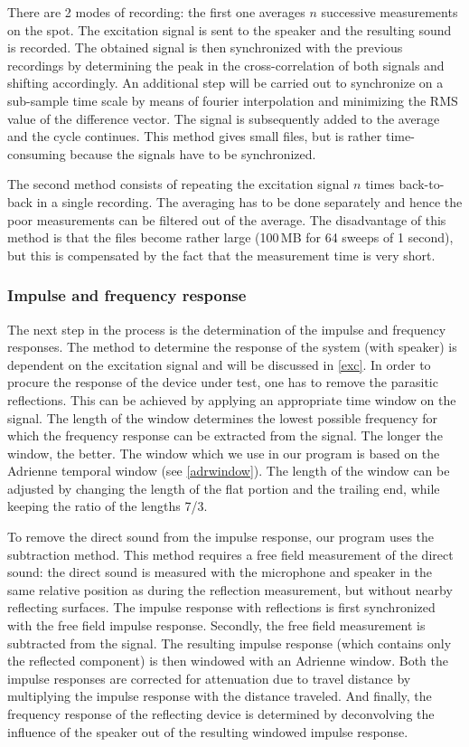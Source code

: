 There are 2 modes of recording: the first one averages $n$ successive measurements on the spot. The excitation signal is sent to the speaker and the resulting sound is recorded. The obtained signal is then synchronized with the previous recordings by determining the peak in the cross-correlation of both signals and shifting accordingly. An additional step will be carried out to synchronize on a sub-sample time scale by means of fourier interpolation and minimizing the RMS value of the difference vector. The signal is subsequently added to the average and the cycle continues. This method gives small files, but is rather time-consuming because the signals have to be synchronized.

The second method consists of repeating the excitation signal $n$ times back-to-back in a single recording. The averaging has to be done separately and hence the poor measurements can be filtered out of the average. The disadvantage of this method is that the files become rather large (100\,MB for 64 sweeps of 1 second), but this is compensated by the fact that the measurement time is very short.



\subsubsection*{Impulse and frequency response}
The next step in the process is the determination of the impulse and frequency responses. The method to determine the response of the system (with speaker) is dependent on the excitation signal and will be discussed in \ref{exc}. In order to procure the response of the device under test, one has to remove the parasitic reflections. This can be achieved by applying an appropriate time window on the signal. The length of the window determines the lowest possible frequency for which the frequency response can be extracted from the signal. The longer the window, the better. The window which we use in our program is based on the Adrienne temporal window (see \ref{adrwindow}). The length of the window can be adjusted by changing the length of the flat portion and the trailing end, while keeping the ratio of the lengths 7/3.

To remove the direct sound from the impulse response, our program uses the subtraction method. This method requires a free field measurement of the direct sound: the direct sound is measured with the microphone and speaker in the same relative position as during the reflection measurement, but without nearby reflecting surfaces. The impulse response with reflections is first synchronized with the free field impulse response. Secondly, the free field measurement is subtracted from the signal. The resulting impulse response (which contains only the reflected component) is then windowed with an Adrienne window. Both the impulse responses are corrected for attenuation due to travel distance by multiplying the impulse response with the distance traveled. And finally, the frequency response of the reflecting device is determined by deconvolving the influence of the speaker out of the resulting windowed impulse response.



